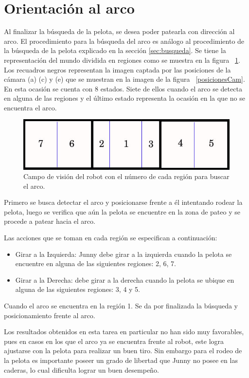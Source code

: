\section{Orientaci\'on al arco}

Al finalizar la búsqueda de la pelota, se desea poder patearla con dirección al arco. El procedimiento para la búsqueda del arco es an\'alogo al procedimiento de la b\'usqueda de la pelota explicado en la sección \ref{sec:busqueda}.
Se tiene la representación del mundo dividida en regiones como se muestra en la figura ~\ref{divisionCamArco}. Los recuadros negros representan la imagen captada por las posiciones de la cámara (a) (c) y (e) que se muestran en la imagen de la figura ~\ref{posicionesCam}. En esta ocasi\'on se cuenta con 8 estados. Siete de ellos cuando el arco se detecta en alguna de las regiones y el último estado representa la ocasión en la que no se encuentra el arco. 

\begin{figure}[hbtp]
\centering
\includegraphics[scale=0.5]{imagenes/RegionesArco.jpg}
\caption{Campo de visión del robot con el número de cada región para buscar el arco. }
\label{divisionCamArco}
\end{figure}

Primero se busca detectar el arco y posicionarse frente a él intentando rodear la pelota, luego se verifica que a\'un la pelota se encuentre en la zona de pateo y se procede a patear hacia el arco.

Las acciones que se toman en cada regi\'on se especifican a continuación: 
 \begin{itemize}
\item Girar a la Izquierda: Junny debe girar a la izquierda cuando la pelota se encuentre en alguna de las siguientes regiones: 2, 6, 7.

\item Girar a la Derecha: debe girar a la derecha cuando la pelota se ubique en alguna de las siguientes regiones: 3, 4 y 5. 
\end{itemize}

Cuando el arco se encuentra en la regi\'on 1. Se da por finalizada la búsqueda y posicionamiento frente al arco.  

Los resultados obtenidos en esta tarea en particular no han sido muy favorables, pues en casos en los que el arco ya se encuentra frente al robot, este logra ajustarse con la pelota para realizar un buen tiro. Sin embargo para el rodeo de la pelota es importante poseer un grado de libertad que Junny no posee en las caderas, lo cual dificulta lograr un buen desempeño.






